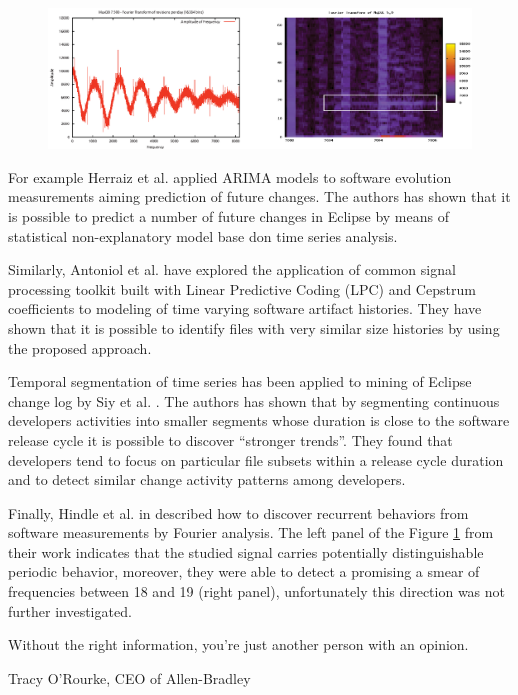 \begin{figure}[t!]
   \centering
   \includegraphics[width=145mm]{figures/FourrierMySQL.eps}
   \caption{}
   \label{fig:mysql-fourrier}
\end{figure}

For example Herraiz et al. \cite{citeulike:6544685} applied ARIMA models to software evolution measurements aiming 
prediction of future changes. The authors has shown that it is possible to predict a number of future changes in 
Eclipse by means of statistical non-explanatory model base don time series analysis. 

Similarly, Antoniol et al. \cite{citeulike:3378725} have explored the application of common signal processing toolkit 
built with Linear Predictive Coding (LPC) and Cepstrum coefficients to modeling of time varying software artifact 
histories. They have shown that it is possible to identify files with very similar size histories by using the 
proposed approach.

Temporal segmentation of time series has been applied to mining of Eclipse change log by Siy et al. \cite{citeulike:10896305}.
The authors has shown that by segmenting continuous developers activities into smaller segments whose duration is close 
to the software release cycle it is possible to discover ``stronger trends''. They found that developers tend to focus 
on particular file subsets within a release cycle duration and to detect similar change activity patterns among developers.

Finally, Hindle et al. in \cite{citeulike:10377345} described how to discover recurrent behaviors from software measurements 
by Fourier analysis. The left panel of the Figure \ref{fig:mysql-fourrier} from their work indicates that the studied 
signal carries potentially distinguishable periodic behavior, moreover, they were able to detect a promising a smear 
of frequencies between 18 and 19 (right panel), unfortunately this direction was not further investigated.

\epigraph{Without the right information, you're just another person with an opinion.}{Tracy O'Rourke, CEO of Allen-Bradley}